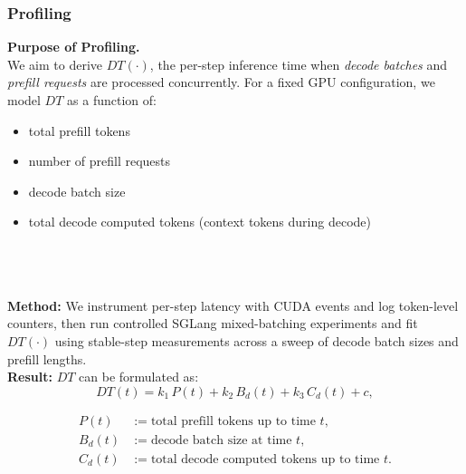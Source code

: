 \subsubsection{Profiling}
\label{subsubsec:instance-profiling}
\textbf{Purpose of Profiling.}\\
We aim to derive $DT(\cdot)$, the per-step inference time when \emph{decode batches} and \emph{prefill requests} are processed concurrently. For a fixed GPU configuration, we model $DT$ as a function of:
\begin{itemize}
    \item total prefill tokens
    \item number of prefill requests
    \item decode batch size
    \item total decode computed tokens (context tokens during decode)
\end{itemize}
\noindent\\
\\
\\
\textbf{Method: } We instrument per-step latency with CUDA events and log token-level counters, then run controlled SGLang mixed-batching experiments and fit $DT(\cdot)$ using stable-step measurements across a sweep of decode batch sizes and prefill lengths.\\
\textbf{Result:} $DT$ can be formulated as:
\[
DT(t)
= k_1 \, P(t)
+ k_2 \, B_d(t)
+ k_3 \, C_d(t)
+c,
\]

\[
\begin{aligned}
P(t) &:= \text{total prefill tokens up to time } t,\\
B_d(t) &:= \text{decode batch size at time } t,\\
C_d(t) &:= \text{total decode computed tokens up to time } t.
\end{aligned}
\]

 

